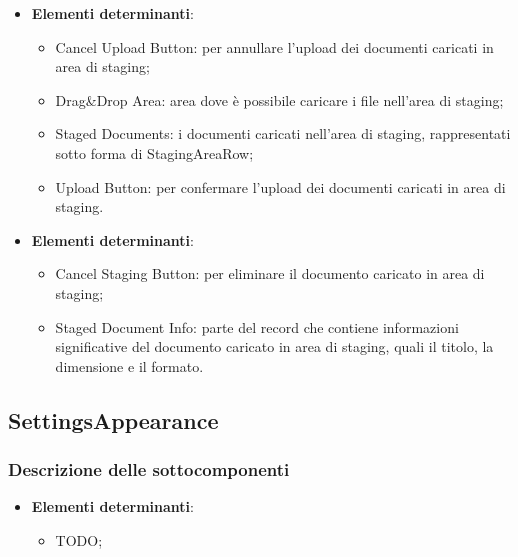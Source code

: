 \documentclass[10pt, a4paper]{article}
\begin{document}
\label{StagingAreaDettaglio}
\begin{itemize}
    \item \textbf{Elementi determinanti}:
     \begin{itemize}
        \item Cancel Upload Button: per annullare l'upload dei documenti caricati in area di staging;
        \item Drag\&Drop Area: area dove è possibile caricare i file nell'area di staging;
        \item Staged Documents: i documenti caricati nell'area di staging, rappresentati sotto forma di StagingAreaRow;
        \item Upload Button: per confermare l'upload dei documenti caricati in area di staging.
    \end{itemize}
\end{itemize}

\label{StagingAreaRowDettaglio}
\begin{itemize}
    \item \textbf{Elementi determinanti}:
     \begin{itemize}
        \item Cancel Staging Button: per eliminare il documento caricato in area di staging;
        \item Staged Document Info: parte del record che contiene informazioni significative del documento caricato in area di staging, quali il titolo, la dimensione e il formato.
    \end{itemize}
\end{itemize}




\subsection{SettingsAppearance}
\subsubsection{Descrizione delle sottocomponenti}

\label{AppearanceHeaderDettaglio}
\begin{itemize}
    \item \textbf{Elementi determinanti}:
     \begin{itemize}
       \item TODO;
    \end{itemize}
\end{itemize}
\end{document}
